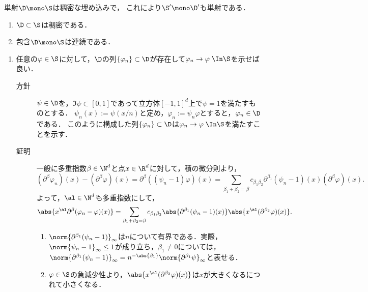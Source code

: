 \documentclass[uplatex,dvipdfmx]{jsreport}
\begin{document}
\begin{tcolorbox}[colframe=ForestGreen, colback=ForestGreen!10!white,breakable,colbacktitle=ForestGreen!40!white,coltitle=black,fonttitle=\bfseries\sffamily,
title=]
    単射$\D\mono\S$は稠密な埋め込みで，
    これにより$\S'\mono\D'$も単射である．
\end{tcolorbox}

\begin{proposition}[試験関数はSchwartz超関数の空間に稠密に埋め込める]\mbox{}
    \begin{enumerate}
        \item $\D\subset\S$は稠密である．
        \item 包含$\D\mono\S$は連続である．
    \end{enumerate}
\end{proposition}
\begin{Proof}\mbox{}
    \begin{enumerate}
        \item 任意の$\varphi\in\S$に対して，$\D$の列$\{\varphi_n\}\subset\D$が存在して$\varphi_n\to\varphi\;\In\S$を示せば良い．
        \begin{description}
            \item[方針] $\psi\in\D$を，$\Im\psi\subset[0,1]$であって立方体$[-1,1]^d$上で$\psi=1$を満たすものとする．
            $\psi_n(x):=\psi(x/n)$と定め，$\varphi_n:=\psi_n\varphi$とすると，$\varphi_n\in\D$である．
            このように構成した列$\{\varphi_n\}\subset\D$は$\varphi_n\to\varphi\;\In\S$を満たすことを示す．
            \item[証明] 一般に多重指数$\beta\in\N^d$と点$x\in\R^d$に対して，積の微分則より，
            \[(\partial^\beta\varphi_n)(x)-(\partial^\beta\varphi)(x)=\partial^\beta((\psi_n-1)\varphi)(x)=\sum_{\beta_1+\beta_2=\beta}c_{\beta_1\beta_2}\partial^{\beta_1}(\psi_n-1)(x)(\partial^\beta\varphi)(x).\]
            よって，$\al\in\N^d$も多重指数にして，
            \[\abs{x^\al\partial^\beta(\varphi_n-\varphi)(x)}=\sum_{\beta_1+\beta_2=\beta}c_{\beta_1\beta_2}\abs{\partial^{\beta_1}(\psi_n-1)(x)}\abs{x^\al(\partial^{\beta_2}\varphi)(x)}.\]
            \begin{enumerate}
                \item $\norm{\partial^{\beta_1}(\psi_n-1)}_\infty$は$n$について有界である．実際，$\norm{\psi_n-1}_\infty\le1$が成り立ち，$\beta_1\ne0$については，$\norm{\partial^{\beta_1}(\psi_n-1)}_\infty=n^{-\abs{\beta_1}}\norm{\partial^{\beta_1}\psi}_\infty$と表せる．
                \item $\varphi\in\S$の急減少性より，$\abs{x^\al(\partial^{\beta_2}\varphi)(x)}$は$x$が大きくなるにつれて小さくなる．

\end{enumerate}
\end{description}
\end{enumerate}
\end{Proof}
\end{document}
